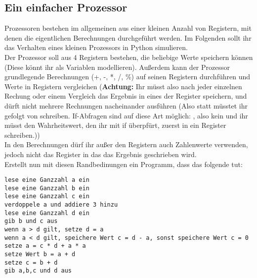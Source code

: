 \subsection{Ein einfacher Prozessor}
Prozessoren bestehen im allgemeinen aus einer kleinen Anzahl von Registern, mit denen die eigentlichen Berechnungen durchgeführt werden. Im Folgenden sollt ihr das Verhalten eines kleinen Prozessors in Python simulieren. \\
Der Prozessor soll aus 4 Registern bestehen, die beliebige Werte speichern können (Diese könnt ihr als Variablen modellieren). Außerdem kann der Prozessor grundlegende Berechnungen (+, -, *, /, \%) auf seinen Registern durchführen und Werte in Registern vergleichen (\textbf{Achtung:} Ihr müsst also nach jeder einzelnen Rechung oder einem Vergleich das Ergebnis in eines der Register speichern, und dürft nicht mehrere Rechnungen nacheinander ausführen (Also statt  müsstet ihr  gefolgt von  schreiben. If-Abfragen sind auf diese Art möglich: , also kein  und ihr müsst den Wahrheitswert, den ihr mit if überpfürt, zuerst in ein Register schreiben.)) \\
In den Berechnungen dürf ihr außer den Registern auch Zahlenwerte verwenden, jedoch nicht das Register in das das Ergebnis geschrieben wird.\\
Erstellt nun mit diesen Randbedinungen ein Programm, dass das folgende tut: \\
\begin{lstlisting}
lese eine Ganzzahl a ein
lese eine Ganzzahl b ein
lese eine Ganzzahl c ein
verdoppele a und addiere 3 hinzu
lese eine Ganzzahl d ein
gib b und c aus
wenn a > d gilt, setze d = a
wenn a < d gilt, speichere Wert c = d - a, sonst speichere Wert c = 0
setze a = c * d + a * a
setze Wert b = a + d
setze c = b + d
gib a,b,c und d aus
\end{lstlisting}
